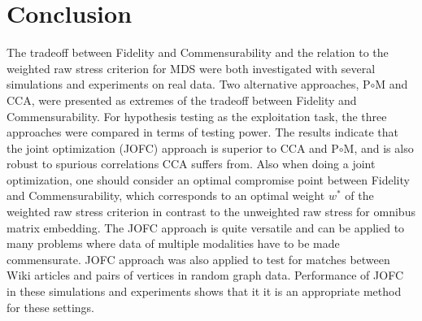 \documentclass[11pt]{article} %
\begin{document}
\section{Conclusion}
 The tradeoff between Fidelity and Commensurability and the relation to the weighted raw stress criterion for MDS were both investigated with several simulations and experiments on real data.
  Two alternative approaches, P$\circ$M and CCA, were presented as extremes of the tradeoff  between Fidelity and Commensurability.
   For  hypothesis testing as the exploitation task, the three approaches were compared in terms of testing power.
    The results indicate that the joint optimization (JOFC) approach is superior to CCA and  P$\circ$M,
     and is also robust to spurious correlations CCA suffers from.
      Also when doing a joint optimization, one should consider an optimal compromise point between Fidelity and Commensurability,
       which corresponds to an optimal weight $w^*$ of the weighted raw stress criterion in contrast to the unweighted raw stress 
        for omnibus matrix embedding. 
        The JOFC approach is quite versatile and can be applied to many problems where data of multiple modalities have to be made commensurate. 
        JOFC approach was also applied to  test for matches between Wiki articles and pairs of vertices in random graph data.  Performance of JOFC in these simulations and experiments shows that it 
        it is an appropriate method for these settings.  







\end{document}
